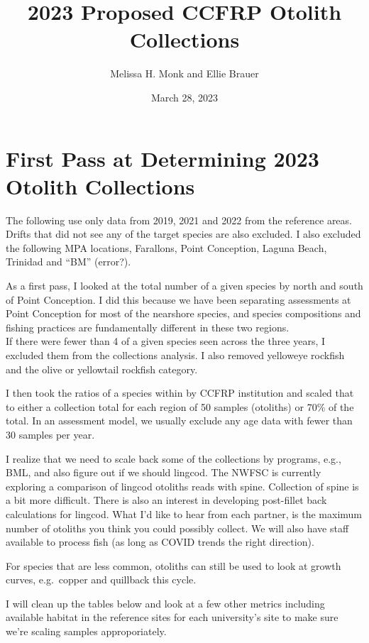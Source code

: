 \documentclass[
]{article}
\title{2023 Proposed CCFRP Otolith Collections}
\author{Melissa H. Monk and Ellie Brauer}
\date{March 28, 2023}
\begin{document}
\maketitle

\hypertarget{first-pass-at-determining-2023-otolith-collections}{%
\section{First Pass at Determining 2023 Otolith Collections}\label{first-pass-at-determining-2023-otolith-collections}}

The following use only data from 2019, 2021 and 2022 from the reference areas. Drifts that did not see any of the target species are also excluded. I also excluded the following MPA locations, Farallons, Point Conception, Laguna Beach, Trinidad and ``BM'' (error?).

As a first pass, I looked at the total number of a given species by north and south
of Point Conception. I did this because we have been separating assessments at
Point Conception for most of the nearshore species, and species compositions and
fishing practices are fundamentally different in these two regions.\\
If there were fewer than 4 of a given species seen across the three years, I
excluded them from the collections analysis. I also removed yelloweye rockfish
and the olive or yellowtail rockfish category.

I then took the ratios of a
species within by CCFRP institution and scaled that to either a collection total
for each region of 50 samples (otoliths) or 70\% of the total. In an assessment model,
we usually exclude any age data with fewer than 30 samples per year.

I realize that we need to scale back some of the collections by programs, e.g., BML,
and also figure out if we should lingcod. The NWFSC is currently exploring
a comparison of lingcod otoliths reads with spine. Collection of spine is a bit more
difficult. There is also an interest in developing post-fillet back calculations
for lingcod. What I'd like to hear from each partner, is the maximum number of
otoliths you think you could possibly collect. We will also have staff available
to process fish (as long as COVID trends the right direction).

For species that are less common, otoliths can still be used to look at growth
curves, e.g.~copper and quillback this cycle.

I will clean up the tables below and look at a few other metrics including
available habitat in the reference sites for each university's site to make sure
we're scaling samples approporiately.
\end{document}
